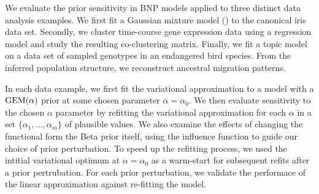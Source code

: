 We evaluate the prior sensitivity in BNP models applied to three distinct data analysis examples.
We first fit a Gaussian mixture model () to the canonical iris data set.
Secondly, we cluster time-course gene expression data using a regression model
and study the resulting co-clustering matrix.
Finally, we fit a topic model
on a data set of sampled genotypes in an endangered bird species.
From the inferred population structure,
we reconstruct ancestral migration patterns.

In each data example, we first fit the variational approximation to a model
with a $\mathrm{GEM}(\alpha)$ prior at some chosen parameter $\alpha = \alpha_0$.
We then evaluate sensitivity to the chosen $\alpha$ parameter
by refitting the variational approximation for each $\alpha$
in a set $\{\alpha_1, ..., \alpha_m\}$ of plausible values.
We also examine the effects of changing the functional form the Beta prior itself,
using the influence function to guide our choice of prior perturbation.
To speed up the refitting process, we used the intitial
variational optimum at $\alpha = \alpha_0$ as a warm-start
for subsequent refits after a prior pertrubation.
For each prior perturbation,
we validate the performace of the linear approximation against
re-fitting the model.
